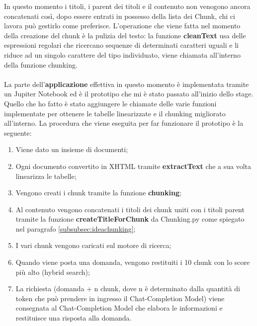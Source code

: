 \noindent In questo momento i titoli, i parent dei titoli e il contenuto non venogono ancora concatenati così, dopo essere entrati in possesso della lista dei Chunk, chi ci lavora può gestirlo come preferisce.
L'operazione che viene fatta nel momento della creazione del chunk è la pulizia del testo: la funzione \textbf{cleanText} usa delle espressioni regolari che ricercano sequenze di determinati caratteri uguali e li riduce ad un singolo carattere del tipo individuato, viene chiamata all'interno della funzione chunking.
\\\\
\noindent La parte dell'\textbf{applicazione} effettiva in questo momento è implementata tramite un Jupiter Notebook ed è il prototipo che mi è stato passato all'inizio dello stage.
Quello che ho fatto è stato aggiungere le chiamate delle varie funzioni implementate per ottenere le tabelle linearizzate e il chunking migliorato all'interno.
La procedura che viene eseguita per far funzionare il prototipo è la seguente:
\begin{enumerate}
    \item Viene dato un insieme di documenti;
    \item Ogni documento convertito in XHTML tramite \textbf{extractText} che a sua volta linearizza le tabelle;
    \item Vengono creati i chunk tramite la funzione \textbf{chunking};
    \item Al contenuto vengono concatenati i titoli dei chunk uniti con i titoli parent tramite la funzione \textbf{createTitleForChunk} da Chunking.py come spiegato nel paragrafo \ref{subsubsec:ideachunking};
    \item I vari chunk vengono caricati sul motore di ricerca;
    \item Quando viene posta una domanda, vengono restituiti i 10 chunk con lo score più alto (hybrid search);
    \item La richiesta (domanda + n chunk, dove n è determinato dalla quantità di token che può prendere in ingresso il Chat-Completion Model) viene consegnata al Chat-Completion Model che elabora le informazioni e restituisce una risposta alla domanda. 
\end{enumerate}


